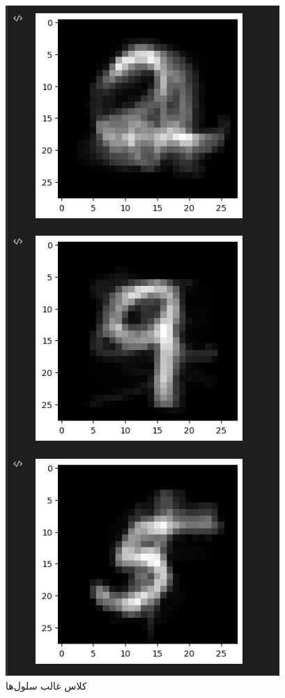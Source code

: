 \documentclass{article}
\begin{document}
\begin{figure}[!h]
    \centering\includegraphics[scale=.65]{./p6-4}
    \caption{کلاس غالب سلول‌ها}\label{fig.64}
\end{figure}
\end{document}
